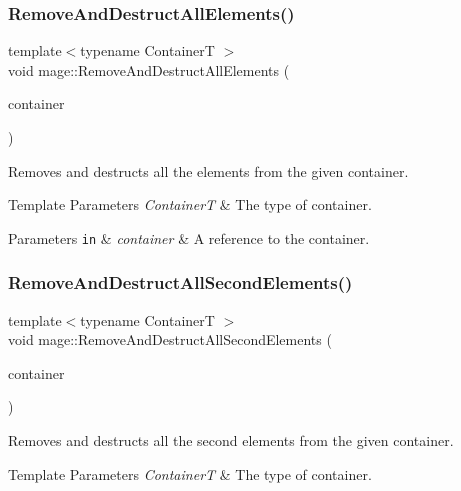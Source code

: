 \subsubsection{\texorpdfstring{Remove\+And\+Destruct\+All\+Elements()}{RemoveAndDestructAllElements()}}
{\footnotesize\ttfamily template$<$typename ContainerT $>$ \\
void mage\+::\+Remove\+And\+Destruct\+All\+Elements (\begin{DoxyParamCaption}\item[{ContainerT \&}]{container }\end{DoxyParamCaption})}

Removes and destructs all the elements from the given container.


\begin{DoxyTemplParams}{Template Parameters}
{\em ContainerT} & The type of container. \\
\hline
\end{DoxyTemplParams}

\begin{DoxyParams}[1]{Parameters}
\mbox{\tt in}  & {\em container} & A reference to the container. \\
\hline
\end{DoxyParams}
\hypertarget{namespacemage_aa3db059e4b0563e46cdf3a3a369c3288}{}\label{namespacemage_aa3db059e4b0563e46cdf3a3a369c3288} 
\subsubsection{\texorpdfstring{Remove\+And\+Destruct\+All\+Second\+Elements()}{RemoveAndDestructAllSecondElements()}}
{\footnotesize\ttfamily template$<$typename ContainerT $>$ \\
void mage\+::\+Remove\+And\+Destruct\+All\+Second\+Elements (\begin{DoxyParamCaption}\item[{ContainerT \&}]{container }\end{DoxyParamCaption})}

Removes and destructs all the second elements from the given container.


\begin{DoxyTemplParams}{Template Parameters}
{\em ContainerT} & The type of container. \\
\hline
\end{DoxyTemplParams}

